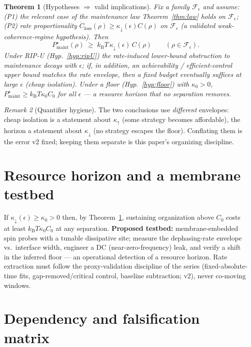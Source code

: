 \documentclass[11pt,a4paper]{article}
\theoremstyle{plain}
\newtheorem{theorem}{Theorem}[section]
\theoremstyle{definition}
\theoremstyle{remark}
\newtheorem{remark}[theorem]{Remark}
\newcommand{\kB}{k_{\mathrm{B}}}
\newcommand{\eps}{\epsilon}
\newcommand{\kup}{\kappa_{\uparrow}}
\newcommand{\kdn}{\kappa_{\downarrow}}
\newcommand{\Closs}{\dot{C}_{\mathrm{loss}}}
\begin{document}
\begin{theorem}[Hypotheses $\Rightarrow$ valid implications]\label{thm:pipeline}
Fix a family $\mathcal{F}_\eps$ and assume:
(P1) the relevant case of the maintenance law Theorem~\ref{thm:law} holds on
$\mathcal{F}_\eps$; (P2) rate proportionality $\Closs(\rho) \ge \kdn(\eps)
C(\rho)$ on $\mathcal{F}_\eps$ (a validated weak-coherence-regime hypothesis).
Then
\begin{equation}
P^\star_{\mathrm{maint}}(\rho) \;\ge\; \kB T\,\kdn(\eps)\,C(\rho)
\qquad (\rho \in \mathcal{F}_\eps).
\end{equation}
Under RIP-U (Hyp.~\ref{hyp:ripU}) the rate-induced \emph{lower-bound
obstruction} to maintenance decays with $\eps$; if, in addition, an
achievability / efficient-control \emph{upper} bound matches the rate
envelope, then a fixed budget eventually suffices at large $\eps$ (cheap
isolation). Under a floor (Hyp.~\ref{hyp:floor}) with $\kappa_0 > 0$,
$P^\star_{\mathrm{maint}} \ge \kB T\kappa_0 C_0$ for all $\eps$ --- a
resource horizon that no separation removes.
\end{theorem}

\begin{remark}[Quantifier hygiene]
The two conclusions use \emph{different} envelopes: cheap isolation is a
statement about $\kup$ (some strategy becomes affordable), the horizon a
statement about $\kdn$ (no strategy escapes the floor). Conflating them is the
error \cite{Stress} v2 fixed; keeping them separate is this paper's
organizing discipline.
\end{remark}

\section{Resource horizon and a membrane testbed}

If $\kdn(\eps) \ge \kappa_0 > 0$ then, by Theorem~\ref{thm:pipeline},
sustaining organization above $C_0$ costs at least $\kB T\kappa_0 C_0$ at any
separation. \textbf{Proposed testbed:} membrane-embedded spin probes with a
tunable dissipative site; measure the dephasing-rate envelope vs.\ interface
width, engineer a DC (near-zero-frequency) leak, and verify a shift in the
inferred floor --- an operational detection of a resource horizon. Rate
extraction must follow the proxy-validation discipline of the series
(fixed-absolute-time fits, gap-removed/critical control, baseline
subtraction; \cite{HCut,Stress} v2), never co-moving windows.

\section{Dependency and falsification matrix}
\end{document}
